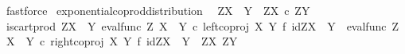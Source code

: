 \begin{isabellebody}
\ fastforce\isanewline
{}\isamarkupfalse%
%
\endisatagproof
{\isafoldproof}%
%
\isadelimproof
\isanewline
%
\endisadelimproof
\isanewline
{}\isamarkupfalse%
\ exponential{\isacharunderscore}{\kern0pt}coprod{\isacharunderscore}{\kern0pt}distribution{\isacharcolon}{\kern0pt}\isanewline
\ \ {\isachardoublequoteopen}Z\isactrlbsup {\isacharparenleft}{\kern0pt}X\ {\isasymCoprod}\ Y{\isacharparenright}{\kern0pt}\isactrlesup \ {\isasymcong}\ {\isacharparenleft}{\kern0pt}Z\isactrlbsup X\isactrlesup {\isacharparenright}{\kern0pt}\ {\isasymtimes}\isactrlsub c\ {\isacharparenleft}{\kern0pt}Z\isactrlbsup Y\isactrlesup {\isacharparenright}{\kern0pt}{\isachardoublequoteclose}\isanewline
%
\isadelimproof
%
\endisadelimproof
%
\isatagproof
{}\isamarkupfalse%
\ {\isacharminus}{\kern0pt}\ \isanewline
\ \ \isamarkupfalse%
\ {\isachardoublequoteopen}is{\isacharunderscore}{\kern0pt}cart{\isacharunderscore}{\kern0pt}prod\ {\isacharparenleft}{\kern0pt}Z\isactrlbsup {\isacharparenleft}{\kern0pt}X\ {\isasymCoprod}\ Y{\isacharparenright}{\kern0pt}\isactrlesup {\isacharparenright}{\kern0pt}\ {\isacharparenleft}{\kern0pt}{\isacharparenleft}{\kern0pt}eval{\isacharunderscore}{\kern0pt}func\ Z\ {\isacharparenleft}{\kern0pt}X\ {\isasymCoprod}\ Y{\isacharparenright}{\kern0pt}\ {\isasymcirc}\isactrlsub c\ {\isacharparenleft}{\kern0pt}left{\isacharunderscore}{\kern0pt}coproj\ X\ Y{\isacharparenright}{\kern0pt}\ {\isasymtimes}\isactrlsub f\ {\isacharparenleft}{\kern0pt}id{\isacharparenleft}{\kern0pt}Z\isactrlbsup {\isacharparenleft}{\kern0pt}X\ {\isasymCoprod}\ Y{\isacharparenright}{\kern0pt}\isactrlesup {\isacharparenright}{\kern0pt}{\isacharparenright}{\kern0pt}\ {\isacharparenright}{\kern0pt}\isactrlsup {\isasymsharp}{\isacharparenright}{\kern0pt}\ {\isacharparenleft}{\kern0pt}{\isacharparenleft}{\kern0pt}eval{\isacharunderscore}{\kern0pt}func\ Z\ {\isacharparenleft}{\kern0pt}X\ {\isasymCoprod}\ Y{\isacharparenright}{\kern0pt}\ {\isasymcirc}\isactrlsub c\ {\isacharparenleft}{\kern0pt}right{\isacharunderscore}{\kern0pt}coproj\ X\ Y{\isacharparenright}{\kern0pt}\ {\isasymtimes}\isactrlsub f\ {\isacharparenleft}{\kern0pt}id{\isacharparenleft}{\kern0pt}Z\isactrlbsup {\isacharparenleft}{\kern0pt}X\ {\isasymCoprod}\ Y{\isacharparenright}{\kern0pt}\isactrlesup {\isacharparenright}{\kern0pt}{\isacharparenright}{\kern0pt}\ {\isacharparenright}{\kern0pt}\isactrlsup {\isasymsharp}{\isacharparenright}{\kern0pt}\ {\isacharparenleft}{\kern0pt}Z\isactrlbsup X\isactrlesup {\isacharparenright}{\kern0pt}\ {\isacharparenleft}{\kern0pt}Z\isactrlbsup Y\isactrlesup {\isacharparenright}{\kern0pt}{\isachardoublequoteclose}\isanewline

\end{isabellebody}
